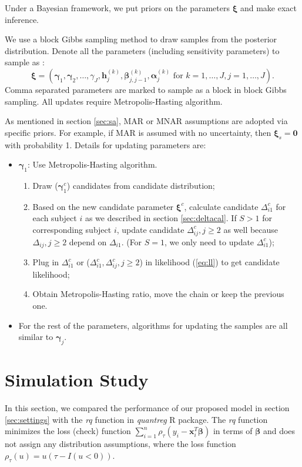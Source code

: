 \documentclass[12pt]{article}
\begin{document}
Under a Bayesian framework, we  put priors on the parameters
$\bm \xi$ and make exact inference.

We use a  block Gibbs sampling method to draw samples from the
posterior distribution. Denote all the parameters (including
sensitivity parameters) to sample as :
\begin{displaymath}
  \bm \xi = \left( \bm \gamma_1, \bm \gamma_2, \ldots, \gamma_J,
   \bm h_{j}^{(k)}, \bm \beta_{j,j-1}^{(k)}, \bm \alpha_j^{(k)}
    \text{ for } k = 1, \ldots, J, j = 1, \ldots, J \right).
\end{displaymath}
Comma separated parameters are marked to sample as a block in block
Gibbs sampling.  All updates require Metropolis-Hasting
algorithm.

As mentioned in section \ref{sec:sa}, MAR or MNAR assumptions are
adopted via specific priors. For example, if MAR is assumed with no
uncertainty, then $ \bm \xi _s= \bm 0$ with probability 1. Details for
updating parameters are:

\begin{itemize}
\item $\bm \gamma_{1} $: Use Metropolis-Hasting algorithm.
  \begin{enumerate}
  \item Draw ($\bm \gamma_{1}^c$) candidates from candidate
    distribution;
  \item Based on the new candidate parameter $\bm \xi^c$, calculate
    candidate $\Delta_{i1}^c$ for each subject $i$ as we described in
    section \ref{sec:deltacal}. If $S > 1$ for corresponding subject
    $i$, update candidate $\Delta_{ij}^c, j \geq 2$ as well because
    $\Delta_{ij}, j \geq 2$ depend on $\Delta_{i1}$. (For $S = 1$, we
    only need to update $\Delta_{i1}^c$);
  \item Plug in $\Delta_{i1}^c$ or ($\Delta_{i1}^c, \Delta_{ij}^c, j
    \geq 2$) in likelihood (\ref{eq:ll}) to get candidate likelihood;
  \item Obtain Metropolis-Hasting ratio, move the chain or keep the
    previous one.
  \end{enumerate}
\item For the rest of the parameters, algorithms for updating the
  samples are all similar to $\bm \gamma_j$.
\end{itemize}

\section{Simulation Study}
\label{sec:simulation}
In this section, we compared the performance of our proposed model in
section \ref{sec:settings} with the \textit{rq} function in
\textit{quantreg} R package. The \textit{rq} function minimizes the
loss (check) function $\sum_{i=1}^n \rho_{\tau} (y_i - \bm x_i^T \bm \beta)$
in terms of $\bm \beta$ and does not assign any distribution
assumptions, where the loss function $\rho_{\tau} (u) = u(\tau - I(u <
0))$.
\end{document}
